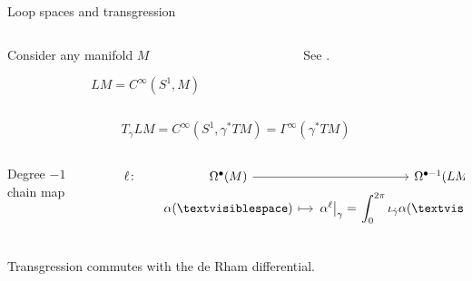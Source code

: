 \documentclass[beamer,10pt]{standalone}
\begin{document}
  \begin{frame}[fragile]{Loop spaces and transgression}\label{frame:LoopSpacesTransgression}
		\begin{columns}
			\begin{column}[T]{0.5\textwidth}
				Consider any manifold $M$
				\begin{defblock}
					$$ LM = C^\infty(S^{1},M)	$$
				\end{defblock}
			\end{column}
			\begin{column}[T]{0.5\textwidth}		
				\begin{propblock}		
					See \cite{Brylinski1993}.
				\end{propblock}
			\end{column}
		\end{columns}
		
		\begin{defblock}
			\begin{displaymath}
				T_{\gamma}LM = C^\infty(S^{1},\gamma^{\ast}TM)= \Gamma^\infty(\gamma^\ast TM)	
			\end{displaymath}
		\end{defblock}

		\begin{defblock}[Trasgression]
			\begin{columns}
				\begin{column}[t]{0.35\textwidth}
					\centering
					Degree $-1$ chain map
				\end{column}
				\begin{column}{0.65\textwidth}
					\[
						\begin{tikzcd}[column sep= small,row sep=0ex]
					    \ell \colon& \Omega^{\bullet}(M) 	\arrow[r]& \Omega^{\bullet -1}(LM) \\
			  		  & \alpha (\textvisiblespace)\arrow[r, mapsto]& 	\left.\alpha^{\ell} \right\vert_{\gamma} =
			    		\left.{\displaystyle\int^{2\pi}_{0} \iota_{\dot{\gamma}}\alpha(\textvisiblespace)} \right\vert_{\gamma(s)} ~ ds
						\end{tikzcd}	
					\]
				\end{column}
			\end{columns}
		\end{defblock}

		\begin{propblock}
		Transgression commutes with the de Rham differential.
		\end{propblock}

  \end{frame}
\end{document}
